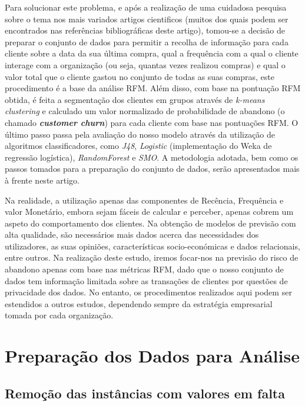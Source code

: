 \documentclass{easychair}
\begin{document}
Para solucionar este problema, e após a realização de uma cuidadosa pesquisa sobre o tema nos mais variados artigos cientificos (muitos dos quais podem ser encontrados nas referências bibliográficas deste artigo), tomou-se a decisão de preparar o conjunto de dados para permitir a recolha de informação para cada cliente sobre a data da sua última compra, qual a frequência com a qual o cliente interage com a organização (ou seja, quantas vezes realizou compras) e qual o valor total que o cliente gastou no conjunto de todas as suas compras, este procedimento é a base da análise RFM. Além disso, com base na pontuação RFM obtida, é feita a segmentação dos clientes em grupos através de \textit{k-means clustering} e calculado um valor normalizado de probabilidade de abandono (o chamado \textbf{\textit{customer churn}}) para cada cliente com base nas pontuações RFM. O último passo passa pela avaliação do nosso modelo através da utilização de algoritmos classificadores, como \textit{J48}, \textit{Logistic} (implementação do Weka de regressão logística), \textit{RandomForest} e \textit{SMO}. A metodologia adotada, bem como os passos tomados para a preparação do conjunto de dados, serão apresentados mais à frente neste artigo.

Na realidade, a utilização apenas das componentes de Recência, Frequência e valor Monetário, embora sejam fáceis de calcular e perceber, apenas cobrem um aspeto do comportamento dos clientes. Na obtenção de modelos de previsão com alta qualidade, são necessários mais dados acerca das necessidades dos utilizadores, as suas opiniões, características socio-económicas e dados relacionais, entre outros\cite{SGEM2008}. Na realização deste estudo, iremos focar-nos na previsão do risco de abandono apenas com base nas métricas RFM, dado que o nosso conjunto de dados tem informação limitada sobre as transações de clientes por questões de privacidade dos dados. No entanto, os procedimentos realizados aqui podem ser estendidos a outros estudos, dependendo sempre da estratégia empresarial tomada por cada organização.


\section{Preparação dos Dados para Análise}
\subsection{Remoção das instâncias com valores em falta}
\end{document}
